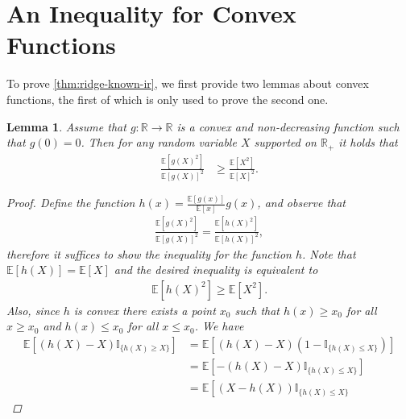 \documentclass[letter, 12pt]{report}
\newcommand{\R}{\mathbb R}
\newcommand{\E}{\mathbb E}
\newcommand{\1}{\mathbf{1}}
\newcommand{\mI}{\mathbb{I}}
\theoremstyle{plain}
\newtheorem{lemma}[theorem]{Lemma}
\theoremstyle{definition}
\theoremstyle{remark}
\begin{document}
\section{An Inequality for Convex Functions}
To prove \cref{thm:ridge-known-ir}, we first provide two
lemmas about convex functions,
the first of which is only used to prove the second one.
\begin{lemma}
    \label{lem:concave}
    Assume that $g: \R \to \R$ is a convex and non-decreasing function
    such that $g(0) = 0$.
    Then for any random variable $X$ supported on $\R_+$
    it holds that
    \begin{align*}
        \frac{
            \E[g(X)^2]
        }{
            \E[g(X)]^2
        }
         & \geq
        \frac{
            \E[X^2]
        }{
            \E[X]^2
        }.
    \end{align*}
    \begin{proof}
        Define the function
        $h(x) = \frac{\E[g(x)]}{\E[x]}g(x)$,
        and observe that
        \begin{align*}
            \frac{
                \E[g(X)^2]
            }{
                \E[g(X)]^2
            }
            =
            \frac{
                \E[h(X)^2]
            }{
                \E[h(X)]^2
            },
        \end{align*}
        therefore it suffices to show the inequality
        for the function $h$.
        Note that $\E[h(X)] = \E[X]$
        and the desired inequality is equivalent to
        \begin{align*}
            \E[h(X)^2]
            \geq
            \E[X^2].
        \end{align*}
        Also, since $h$ is convex there exists a
        point $x_0$ such that $h(x) \geq x_0$
        for all $x \geq x_0$ and $h(x) \leq  x_0$
        for all $x \leq x_0$.
        We have
        \begin{align*}
            \E\left[
                (h(X) - X)
                \mI_{\{h(X) \geq X\}}
                \right]
             & =
            \E\left[
                (h(X) - X)
                (1 - \mI_{\{h(X) \leq X\}})
                \right]
            \\
             & =
            \E\left[
                -
                (h(X) - X)
                \mI_{\{h(X) \leq X\}}
                \right]
            \\
             & =
            \E\left[
                (X - h(X))
                \mI_{\{h(X) \leq X\}}

\end{align*}
\end{proof}
\end{lemma}
\end{document}
